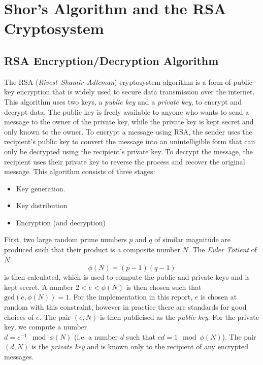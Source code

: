 \documentclass{article}[11pt]
\begin{document}
\pagebreak
\section{Shor's Algorithm and the RSA Cryptosystem}
\subsection{RSA Encryption/Decryption Algorithm}
The RSA (\textit{Rivest–Shamir–Adleman}) cryptosystem algorithm is a form of public-key encryption that is widely used to secure data transmission over the internet. This algorithm uses two keys, a \textit{public key} and a \textit{private key}, to encrypt and decrypt data.\cite{RSA} The public key is freely available to anyone who wants to send a message to the owner of the private key, while the private key is kept secret and only known to the owner. To encrypt a message using RSA, the sender uses the recipient's public key to convert the message into an unintelligible form that can only be decrypted using the recipient's private key. To decrypt the message, the recipient uses their private key to reverse the process and recover the original message. This algorithm consists of three stages:\cite{RSA}
\begin{itemize}
  \item Key generation.
  \item Key distribution
  \item Encryption (and decryption)
\end{itemize}

First, two large random prime numbers $p$ and $q$ of similar magnitude are produced such that their product is a composite number $N$. The \textit{Euler Totient} of $N$
\begin{equation}
\phi(N)=(p-1)(q-1)
\end{equation}
is then calculated, which is used to compute the public and private keys and is kept secret. A number $2<e<\phi(N)$ is then chosen such that $\text{gcd}(e,\phi(N))=1$. For the implementation in this report, $e$ is chosen at random with this constraint, however in practice there are standards for good choices of $e$.\cite{RSAattack} The pair $(e,N)$ is then publicised as the \emph{public key}.\cite{RSA} For the private key, we compute a number \\$d=e^{-1}\mod\phi(N)$ (i.e. a number $d$ such that $ed=1\mod\phi(N)$). The pair $(d,N)$ is the \emph{private key} and is known only to the recipient of any encrypted messages.\cite{RSA}
\end{document}
